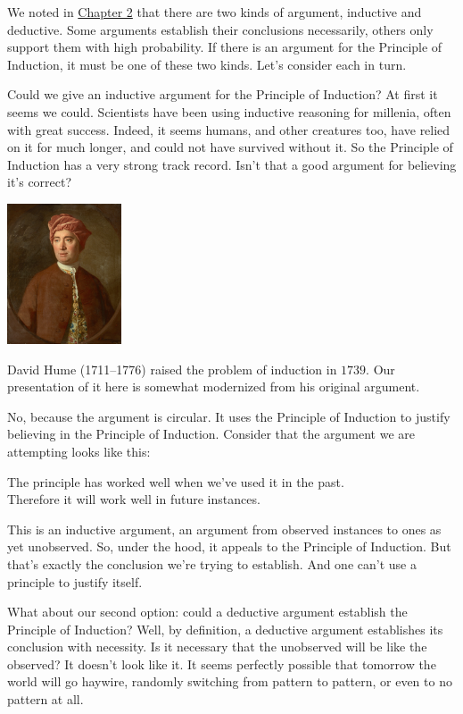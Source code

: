 \documentclass[justified]{tufte-book}
\theoremstyle{definition}
\theoremstyle{definition}
\theoremstyle{definition}
\theoremstyle{definition}
\theoremstyle{remark}
\begin{document}
We noted in \protect\hyperlink{logic}{Chapter 2} that there are two kinds of argument, inductive and deductive. Some arguments establish their conclusions necessarily, others only support them with high probability. If there is an argument for the Principle of Induction, it must be one of these two kinds. Let's consider each in turn.

Could we give an inductive argument for the Principle of Induction? At first it seems we could. Scientists have been using inductive reasoning for millenia, often with great success. Indeed, it seems humans, and other creatures too, have relied on it for much longer, and could not have survived without it. So the Principle of Induction has a very strong track record. Isn't that a good argument for believing it's correct?

\begin{marginfigure}
\includegraphics[width=1.33in]{img/hume} \caption[David Hume (1711--1776) raised the problem of induction in $1739$]{David Hume (1711--1776) raised the problem of induction in $1739$. Our presentation of it here is somewhat modernized from his original argument.}\label{fig:unnamed-chunk-173}
\end{marginfigure}

No, because the argument is circular. It uses the Principle of Induction to justify believing in the Principle of Induction. Consider that the argument we are attempting looks like this:

\begin{argument}
The principle has worked well when we've used it in the past.\\
Therefore it will work well in future instances.
\end{argument}

This is an inductive argument, an argument from observed instances to ones as yet unobserved. So, under the hood, it appeals to the Principle of Induction. But that's exactly the conclusion we're trying to establish. And one can't use a principle to justify itself.

What about our second option: could a deductive argument establish the Principle of Induction? Well, by definition, a deductive argument establishes its conclusion with necessity. Is it necessary that the unobserved will be like the observed? It doesn't look like it. It seems perfectly possible that tomorrow the world will go haywire, randomly switching from pattern to pattern, or even to no pattern at all.
\end{document}
